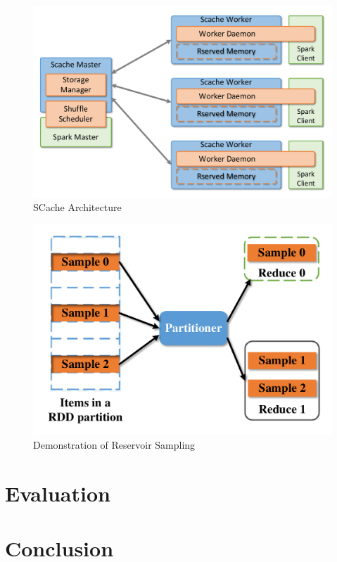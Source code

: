 \documentclass[10pt,twocolumn]{article}
\begin{document}
\begin{figure}
	\centering
	\includegraphics[width=\linewidth]{fig/arch}
	\caption{SCache Architecture}
	\label{fig:arch}
\end{figure}
\begin{figure}
	\centering
	\includegraphics[width=\linewidth]{fig/sample}
	\caption{Demonstration of Reservoir Sampling}
	\label{fig:sample}
\end{figure}
\section{Evaluation}\label{evaluation}

\section{Conclusion}





\end{document}
